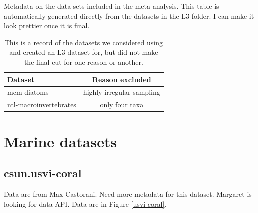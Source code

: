 \documentclass[11pt, oneside]{article}
\begin{document}
\begin{table}[h!]
\scriptsize
   \centering
     \caption{Metadata on the data sets included in the meta-analysis. This table is automatically generated directly from the datasets in the L3 folder. I can make it look prettier once it is final.} 

   \label{metadata} 
\end{table}


\begin{table}[h!]
\scriptsize
   \centering
     \caption{This is a record of the datasets we considered using and created an L3 dataset for, but did not make the final cut for one reason or another.} 
   \begin{tabular}{lc} 
\\
\hline 
\hline
Dataset &Reason excluded\\
\hline
mcm-diatoms & highly irregular sampling\\
ntl-macroinvertebrates & only four taxa\\
   \end{tabular}

   \label{not_used} 
\end{table}


\section {Marine datasets}


\subsection {csun.usvi-coral}
Data are from Max Castorani.
Need more metadata for this dataset.
Margaret is looking for data API.
Data are in Figure \ref{usvi-coral}.
\end{document}
